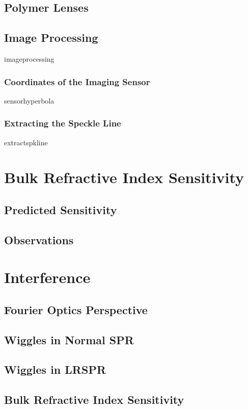 \documentclass[a4paper,titlepage,onecolumn]{report}
\begin{document}
 \section{Polymer Lenses}
 \section{Image Processing}
 {imageprocessing}
  \subsection{Coordinates of the Imaging Sensor}
  {sensorhyperbola}
  \subsection{Extracting the Speckle Line}
  {extractspkline}

\chapter{Bulk Refractive Index Sensitivity} \label{ch:bulkri}
 \section{Predicted Sensitivity}
 \section{Observations}

\chapter{Interference} \label{ch:interference}
 \section{Fourier Optics Perspective}
 \section{Wiggles in Normal SPR}
 \section{Wiggles in LRSPR}
 \section{Bulk Refractive Index Sensitivity}
\end{document}

